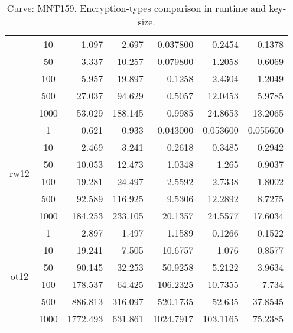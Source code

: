 \documentclass[twoside,11pt,titlepage,a4paper,english,bibliography=totocnumbered,listof=numbered]{scrbook}
\begin{document}
\begin{table}[ht]
{\begin{tabular}{|c|c|r|r|r|r|r|}
&10&    1.097    &    2.697    &    0.037800 &    0.2454   &    0.1378    \\
&50&    3.337    &   10.257    &    0.079800 &    1.2058   &    0.6069    \\
&100&    5.957    &   19.897    &    0.1258   &    2.4304   &    1.2049    \\
&500&   27.037    &   94.629    &    0.5057   &   12.0453   &    5.9785    \\
&1000&   53.029    &  188.145    &    0.9985   &   24.8653   &   13.2065    \\
\hline
\multirow{6}{*}{rw12} &1&    0.621    &    0.933    &    0.043000 &    0.053600 &    0.055600  \\
&10&    2.469    &    3.241    &    0.2618   &    0.3485   &    0.2942    \\
&50&   10.053    &   12.473    &    1.0348   &    1.265    &    0.9037    \\
&100&   19.281    &   24.497    &    2.5592   &    2.7338   &    1.8002    \\
&500&   92.589    &  116.925    &    9.5306   &   12.2892   &    8.7275    \\
&1000&  184.253    &  233.105    &   20.1357   &   24.5577   &   17.6034    \\
\hline
\multirow{6}{*}{ot12} &1&    2.897    &    1.497    &    1.1589   &    0.1266   &    0.1522    \\
&10&   19.241    &    7.505    &   10.6757   &    1.076    &    0.8577    \\
&50&   90.145    &   32.253    &   50.9258   &    5.2122   &    3.9634    \\
&100&  178.537    &   64.425    &  106.2325   &   10.7355   &    7.734     \\
&500&  886.813    &  316.097    &  520.1735   &   52.635    &   37.8545    \\
&1000& 1772.493    &  631.861    & 1024.7917   &  103.1165   &   75.2385    \\
\hline
\end{tabular}}\caption{Curve: MNT159. Encryption-types comparison in runtime and key-size.}\label{table:abe_run_MNT159} \end{table} 
\end{document}
